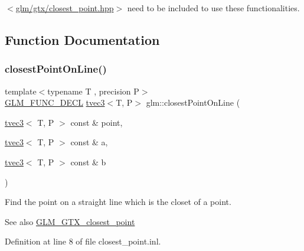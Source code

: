 $<$\mbox{\hyperlink{closest__point_8hpp}{glm/gtx/closest\+\_\+point.\+hpp}}$>$ need to be included to use these functionalities. 

\subsection{Function Documentation}
\mbox{\label{group__gtx__closest__point_gac26353282a8213e469f5e33560c1200f}} 
\subsubsection{\texorpdfstring{closestPointOnLine()}{closestPointOnLine()}\hspace{0.1cm}{\footnotesize\ttfamily [1/2]}}
{\footnotesize\ttfamily template$<$typename T , precision P$>$ \\
\mbox{\hyperlink{setup_8hpp_ab2d052de21a70539923e9bcbf6e83a51}{G\+L\+M\+\_\+\+F\+U\+N\+C\+\_\+\+D\+E\+CL}} \mbox{\hyperlink{structglm_1_1tvec3}{tvec3}}$<$T, P$>$ glm\+::closest\+Point\+On\+Line (\begin{DoxyParamCaption}\item[{\mbox{\hyperlink{structglm_1_1tvec3}{tvec3}}$<$ T, P $>$ const \&}]{point,  }\item[{\mbox{\hyperlink{structglm_1_1tvec3}{tvec3}}$<$ T, P $>$ const \&}]{a,  }\item[{\mbox{\hyperlink{structglm_1_1tvec3}{tvec3}}$<$ T, P $>$ const \&}]{b }\end{DoxyParamCaption})}

Find the point on a straight line which is the closet of a point. \begin{DoxySeeAlso}{See also}
\mbox{\hyperlink{group__gtx__closest__point}{G\+L\+M\+\_\+\+G\+T\+X\+\_\+closest\+\_\+point}} 
\end{DoxySeeAlso}


Definition at line 8 of file closest\+\_\+point.\+inl.

\mbox{\label{group__gtx__closest__point_gadc7010070bb0cacd284f560299b21660}} 
